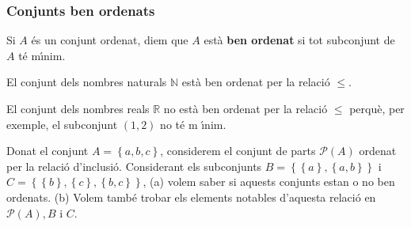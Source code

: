 \subsubsection{Conjunts ben ordenats}

Si $A$ \'{e}s un conjunt ordenat, diem que $A$ est\`{a} \textbf{ben ordenat}
si tot subconjunt de $A$ t\'{e} m\'{\i}nim.

\begin{exemple}
El conjunt dels nombres naturals $\mathbb{N}$ est\`{a} ben ordenat per la
relaci\'{o} $\leq$.
\end{exemple}

\begin{exemple}
El conjunt dels nombres reals $\mathbb{R}$ no est\`{a} ben ordenat per la
relaci\'{o} $\leq$ perqu\`{e}, per exemple, el subconjunt $(1,2)$ no t\'{e} m%
\'{\i}nim.
\end{exemple}

\begin{exemple}
Donat el conjunt $A=\left\{ a,b,c\right\} $, considerem el conjunt de parts $%
\mathcal{P}(A)$ ordenat per la relaci\'{o} d'inclusi\'{o}. Considerant els
subconjunts $B=\left\{ \left\{ a\right\} ,\left\{ a,b\right\} \right\} $ i $%
C=\left\{ \left\{ b\right\} ,\left\{ c\right\} ,\left\{ b,c\right\} \right\}
$, (a) volem saber si aquests conjunts estan o no ben ordenats. (b) Volem
tamb\'{e} trobar els elements notables d'aquesta relaci\'{o} en $\mathcal{P}%
(A),B$ i $C$.
\end{exemple}


